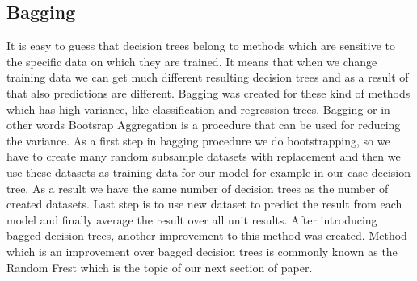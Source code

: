 \subsection{Bagging}
It is easy to guess that decision trees belong to methods which are sensitive to the specific data on which they are trained. It means that when we change training data 
we can get much different resulting decision trees and as a result of that also predictions are different. 
Bagging was created for these kind of methods which has high variance, like classification and regression trees.
Bagging or in other words Bootsrap Aggregation is a procedure that can be used for reducing the variance.
As a first step in bagging procedure we do bootstrapping, so we have to create many random subsample datasets with replacement
and then we use these datasets as training data for our model for example in our case decision tree. As a result we have the same number
of decision trees as the number of created datasets. Last step is to use new dataset to predict the result from each model and finally average the result 
over all unit results. After introducing bagged decision trees, another improvement to this method was created. Method which is an improvement over bagged decision trees 
is commonly known as the Random Frest which is the topic of our next section of paper.